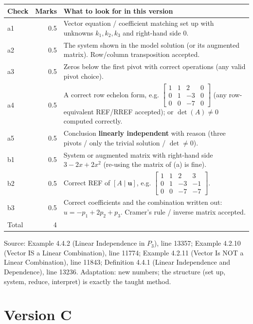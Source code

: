 \documentclass[11pt,a4paper]{article}
\newcommand{\Src}[1]{{\footnotesize\color{black!65}Source: #1}}
\begin{document}
\begin{tabularx}{\linewidth}{@{}l r X@{}}\toprule Check & Marks & What to look for in this version\\\midrule
a1 & 0.5 & Vector equation / coefficient matching set up with unknowns $k_1,k_2,k_3$ and right-hand side $0$.\\
a2 & 0.5 & The system shown in the model solution (or its augmented matrix). Row/column transposition accepted.\\
a3 & 0.5 & Zeros below the first pivot with correct operations (any valid pivot choice).\\
a4 & 0.5 & A correct row echelon form, e.g. $\left[\begin{array}{ccc|c} 1 & 1 & 2 & 0 \\ 0 & 1 & -3 & 0 \\ 0 & 0 & -7 & 0 \end{array}\right]$ (any row-equivalent REF/RREF accepted); or $\det(A)\neq0$ computed correctly.\\
a5 & 0.5 & Conclusion \textbf{linearly independent} with reason (three pivots / only the trivial solution / $\det\neq0$).\\
b1 & 0.5 & System or augmented matrix with right-hand side $3-2x+2x^{2}$ (re-using the matrix of (a) is fine).\\
b2 & 0.5 & Correct REF of $[A\mid\mathbf{u}]$, e.g. $\left[\begin{array}{ccc|c} 1 & 1 & 2 & 3 \\ 0 & 1 & -3 & -1 \\ 0 & 0 & -7 & -7 \end{array}\right]$.\\
b3 & 0.5 & Correct coefficients and the combination written out: $u=-p_1+2p_2+p_3$. Cramer's rule / inverse matrix accepted.\\
\midrule Total & 4 & \\\bottomrule\end{tabularx}
\Src{Example 4.4.2 (Linear Independence in $P_3$), line 13357; Example 4.2.10 (Vector IS a Linear Combination), line 11774; Example 4.2.11 (Vector Is NOT a Linear Combination), line 11843; Definition 4.4.1 (Linear Independence and Dependence), line 13236. Adaptation: new numbers; the structure (set up, system, reduce, interpret) is exactly the taught method.}\par
\clearpage\section*{Version C}
\end{document}
